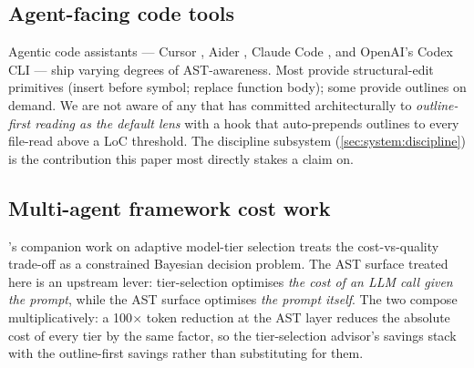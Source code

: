 \subsection{Agent-facing code tools}

Agentic code assistants --- Cursor \cite{cursor}, Aider \cite{aider},
Claude Code \cite{anthropic2024claudecode}, and OpenAI's Codex CLI
\cite{openai_codex_cli} --- ship varying degrees of AST-awareness. Most
provide structural-edit primitives (insert before symbol; replace
function body); some provide outlines on demand. We are not aware of
any that has committed architecturally to \emph{outline-first reading
as the default lens} with a hook that auto-prepends outlines to every
file-read above a LoC threshold. The discipline subsystem
(\cref{sec:system:discipline}) is the contribution this paper most
directly stakes a claim on.

\subsection{Multi-agent framework cost work}

\blackrim's companion work on adaptive model-tier selection
\cite{blackrim_moa_paper} treats the cost-vs-quality trade-off as a
constrained Bayesian decision problem. The AST surface treated here is
an upstream lever: tier-selection optimises \emph{the cost of an
LLM call given the prompt}, while the AST surface optimises \emph{the
prompt itself}. The two compose multiplicatively: a 100$\times$ token
reduction at the AST layer reduces the absolute cost of every tier by
the same factor, so the tier-selection advisor's savings stack with
the outline-first savings rather than substituting for them.
